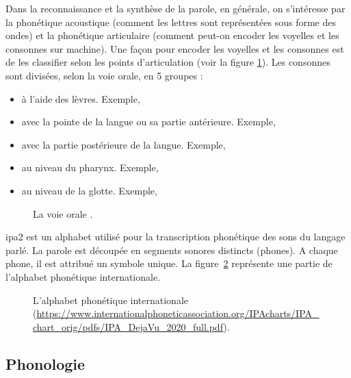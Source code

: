 \documentclass{KodeBook}
\begin{document}
Dans la reconnaissance et la synthèse de la parole, en générale, on s'intéresse par la phonétique acoustique (comment les lettres sont représentées sous forme des ondes) et la phonétique articulaire (comment peut-on encoder les voyelles et les consonnes sur machine).
Une façon pour encoder les voyelles et les consonnes est de les classifier selon les points d'articulation (voir la figure \ref{fig:articulation}). 
Les consonnes sont divisées, selon la voie orale, en 5 groupes :
\begin{itemize}
	\item {} à l'aide des lèvres. Exemple, \expword{\textipa{[b], [p], [m], [f], [v]}}
	\item {} avec la pointe de la langue ou sa partie antérieure. 
	Exemple, 
	\item {} avec la partie postérieure de la langue. Exemple, 
	\item {} au niveau du pharynx. 
	Exemple, 
	\item {} au niveau de la glotte. 
	Exemple, 
\end{itemize}

\begin{figure}[ht]
	\centering 
	\caption{La voie orale \cite{2009-ball}. \label{fig:articulation}}
\end{figure}

\ac{ipa2} est un alphabet utilisé pour la transcription phonétique des sons du langage parlé.  
La parole est découpée en segments sonores distincts (phones). 
A chaque phone, il est attribué un symbole unique. 
La figure~\ref{fig:ipa} représente une partie de l'alphabet phonétique internationale.

\begin{figure}[ht]
	\centering 
	\caption{L'alphabet phonétique internationale  (\url{https://www.internationalphoneticassociation.org/IPAcharts/IPA_chart_orig/pdfs/IPA_DejaVu_2020_full.pdf}). \label{fig:ipa}}
\end{figure}


\subsection{Phonologie}
\end{document}
